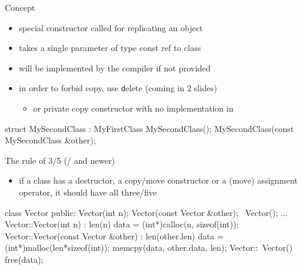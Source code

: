 \begin{frame}[fragile]
  \begin{block}{Concept}
    \begin{itemize}
    \item special constructor called for replicating an object
    \item takes a single parameter of type const ref to class
    \item will be implemented by the compiler if not provided
    \item in order to forbid copy, use {\texttt delete} (coming in 2 slides)
      \begin{itemize}
      \item or private copy constructor with no implementation in 
      \end{itemize}
    \end{itemize}
  \end{block}
  \pause
  \begin{cppcode}
    struct MySecondClass : MyFirstClass {
      MySecondClass();
      MySecondClass(const MySecondClass &other);
    }
  \end{cppcode}
  \pause
  \begin{exampleblock}{The rule of 3/5 (/ and newer)}
    \begin{itemize}
    \item if a class has a destructor, a copy/move constructor or a (move) assignment operator, it should have all three/five
    \end{itemize}
  \end{exampleblock}
\end{frame}

\begin{frame}[fragile]
  \begin{cppcode}
    class Vector {
    public:
      Vector(int n);
      Vector(const Vector &other);
      ~Vector();
      ...
    }
    Vector::Vector(int n) : len(n) {
      data = (int*)calloc(n, sizeof(int));
    }
    Vector::Vector(const Vector &other) : len(other.len) {
      data = (int*)malloc(len*sizeof(int));
      memcpy(data, other.data, len);
    }
    Vector::~Vector() { free(data); }
  \end{cppcode}
\end{frame}

